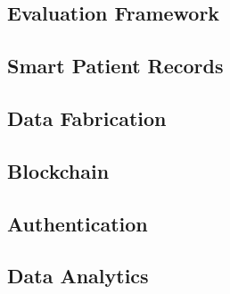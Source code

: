 \subsection{Evaluation Framework}

\subsection{Smart Patient Records}

\subsection{Data Fabrication}

\subsection{Blockchain}

\subsection{Authentication}

\subsection{Data Analytics}

